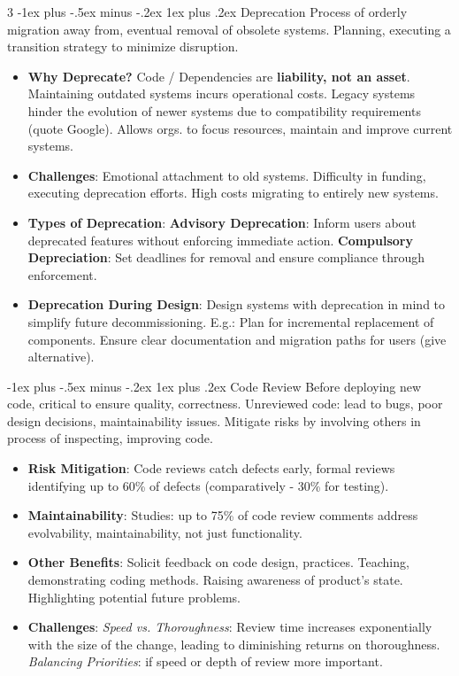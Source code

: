 \documentclass[a4paper, 10pt, landscape]{article}
\makeatletter
\renewcommand{\subsubsection}{\@startsection{subsubsection}{3}{0mm}%
                                {-1ex plus -.5ex minus -.2ex}%
                                {1ex plus .2ex}%
                                {\normalfont\small\bfseries}}
\makeatother
\begin{document}
\begin{multicols*}{3}
\subsubsection{Deprecation}
Process of orderly migration away from, eventual removal of obsolete systems. Planning, executing a transition strategy to minimize disruption.
\begin{itemize}
    \item \textbf{Why Deprecate?} Code / Dependencies are \textbf{liability, not an asset}. Maintaining outdated systems incurs operational costs. Legacy systems hinder the evolution of newer systems due to compatibility requirements (quote Google). Allows orgs. to focus resources, maintain and improve current systems.
	\item \textbf{Challenges}: Emotional attachment to old systems. Difficulty in funding, executing deprecation efforts. High costs migrating to entirely new systems.
	\item \textbf{Types of Deprecation}: \textbf{Advisory Deprecation}: Inform users about deprecated features without enforcing immediate action. \textbf{Compulsory Depreciation}: Set deadlines for removal and ensure compliance through enforcement.
	\item \textbf{Deprecation During Design}: Design systems with deprecation in mind to simplify future decommissioning. E.g.:
Plan for incremental replacement of components. Ensure clear documentation and migration paths for users (give alternative).
\end{itemize}

\subsubsection{Code Review}
Before deploying new code, critical to ensure quality, correctness. Unreviewed code: lead to bugs, poor design decisions, maintainability issues. Mitigate risks by involving others in process of inspecting, improving code.
\begin{itemize}[itemsep=-1pt]
    \item \textbf{Risk Mitigation}: Code reviews catch defects early, formal reviews identifying up to 60\% of defects (comparatively - 30\% for testing).
    \item \textbf{Maintainability}: Studies: up to 75\% of code review comments address evolvability, maintainability, not just functionality.
    \item \textbf{Other Benefits}: Solicit feedback on code design, practices. Teaching, demonstrating coding methods. Raising awareness of product's state. Highlighting potential future problems.
  	\item \textbf{Challenges}: \textit{Speed vs. Thoroughness}: Review time increases exponentially with the size of the change, leading to diminishing returns on thoroughness. \textit{Balancing Priorities}: if speed or depth of review more important.
\end{itemize}


\end{multicols*}
\end{document}
